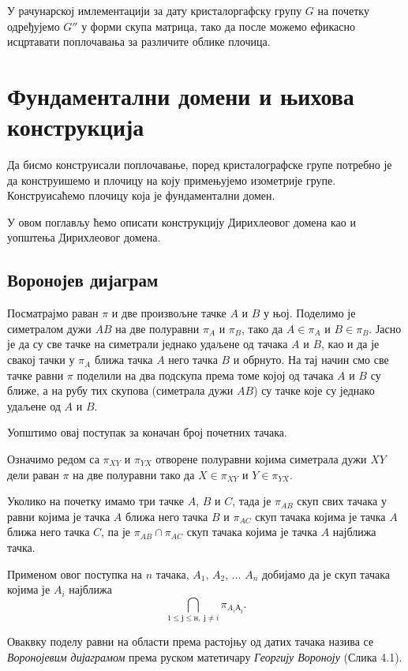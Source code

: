 \documentclass[12pt]{report}
\begin{document}
У рачунарској имлементацији за дату кристалоргафску групу $G$ на почетку одређујемо $G''$ у форми скупа матрица, тако да после можемо ефикасно исцртавати поплочавања за различите облике плочица.





\chapter{Фундаментални домени и њихова конструкција}\label{dirihleova-fundamentalna-oblast} 

Да бисмо конструисали поплочавање, поред кристалографске групе потребно је да конструишемо и плочицу на коју примењујемо изометрије групе. Конструисаћемо плочицу која је фундаментални домен.

У овом поглављу ћемо описати конструкцију Дирихлеовог домена као и уопштења Дирихлеовог домена.
\section{Воронојев дијаграм}


Посматрајмо раван $\pi$ и две произвољне тачке $A$ и $B$ у њој. Поделимо је симетралом дужи $AB$ на две полуравни $\pi _A$ и $\pi _B$, тако да $A \in \pi _ A$ и $B \in \pi _B$. Јасно је да су све тачке на симетрали једнако удаљене од тачака $A$ и $B$, као и да је свакој тачки у $\pi _A$ ближа тачка $A$ него тачка $B$ и обрнуто. 
На тај начин смо све тачке равни $\pi$ поделили на два подскупа према томе којој од тачака $A$ и $B$ су ближе, а на рубу тих скупова (симетрала дужи $AB$) су тачке које су једнако удаљене од $A$ и $B$.

Уопштимо овај поступак за коначан број почетних тачака.

Означимо редом са $\pi _{XY}$ и $\pi _{YX}$ отворене полуравни којима симетрала дужи $XY$ дели раван $\pi$ на две полуравни тако да $X \in \pi _ {XY}$ и $Y \in \pi _{YX}$. 

Уколико на почетку имамо три тачке $A$, $B$ и $C$, тада је $\pi _{AB}$ скуп свих тачака у равни којима је тачка $A$ ближа него тачка $B$ и $\pi _{AC}$ скуп тачака којима је тачка $A$ ближа него тачка $C$, па је $\pi _{AB} \cap \pi _{AC}$ скуп тачака којима је тачка $A$ најближа тачка.

Применом овог поступка на  $n$ тачака, $A_1$, $A_2$, ... $A_n$ добијамо да је скуп тачака којима је $A_i$ најближа   $$\bigcap _{1\leq ј\leq н,\; ј\neq i} \pi_{A_i А_ј}.$$

Оваквку поделу равни на области према растојњу од датих тачака назива се \emph{Воронојевим дијаграмом} према руском матетичару \emph{Георгију Вороноју} (Слика 4.1).
\end{document}
